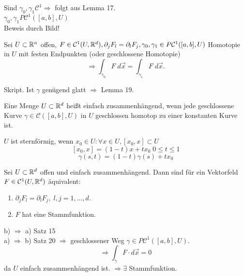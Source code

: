 \documentclass[../ana2.tex]{subfiles}
\begin{document}
\begin{bew}
    Sind \(\gamma_0, \gamma_1 \mathcal{C}^1 \Rightarrow\) folgt aus Lemma 17.\\
    \(\gamma_0,\gamma_1 P \mathcal{C}^1([a,b], U)\)\\    
    Beweis durch Bild!
\end{bew}
\begin{satz}[Homotopieinvarianz]
    Sei \( U \subset \mathbb{R}^n \) offen, \( F \in \mathcal{C}^1(U, \mathbb{R}^d), 
    \partial_j F_l = \partial_l F_j, \gamma_0, \gamma_1 \in P\mathcal{C}^1([a,b], U) \)
    Homotopie in \( U \) mit festen Endpunkten (oder geschlossene Homotopie)
    \[ \Rightarrow \int_{\gamma_0} F \; d\vec{x} = \int_{\gamma_1} F \; d\vec{x}. \]
\end{satz}
\begin{bew}
    Skript. Ist \( \gamma \) genügend glatt \( \Rightarrow \) Lemma 19.
\end{bew}
\begin{defi}
    Eine Menge \(U \subset \mathbb{R}^d\) heißt einfach zusammenhängend, wenn jede
    geschlossene Kurve \(\gamma \in \mathcal{C}([a,b], U)\) in \(U\)
    geschlossen homotop zu einer konstanten Kurve ist.
\end{defi}
\begin{bsp}
    \(U\) ist sternförmig, wenn 
    \( x_0 \in U: \forall x \in U, [x_0, x] \subset U \)
    \[ [x_0, x] = (1-t) x + tx_0 \; 0 \leq t \leq 1 \]
    \[ \gamma(s,t) = (1-t) \gamma(s) + t x_0 \]
\end{bsp}
\begin{satz}
    Sei \( U \subset \mathbb{R}^d \) offen und einfach zusammenhängend. Dann sind für ein Vektorfeld 
    \( F \in \mathcal{C}^1(U, \mathbb{R}^d) \) äquivalent:
    \begin{enumerate}
        \item \( \partial_j F_l = \partial_l F_j,\; l,j = 1,\ldots, d \).
        \item \( F \) hat eine Stammfunktion.
    \end{enumerate}
\end{satz}
\begin{bew}
    b) \(\Rightarrow\) a) Satz 15\\
    a) \(\Rightarrow\) b) Satz 20 \(\Rightarrow\) geschlossener Weg \( \gamma \in P \mathcal{C}^1([a,b], U) \).
    \[ \Rightarrow \int_\gamma F \cdot d\vec{x} = 0 \]
    da \( U \) einfach zusammenhängend ist.
    \( \Rightarrow \exists \) Stammfunktion.
\end{bew}
\end{document}
